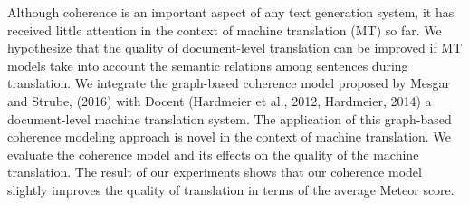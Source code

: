 Although coherence is an important aspect of any text generation system, it has received little attention in the context of machine translation (MT) so far. We hypothesize that the quality of document-level translation can be improved if MT models take into account the semantic relations among sentences during translation. We integrate the graph-based coherence model proposed by Mesgar and Strube, (2016) with Docent (Hardmeier et al., 2012, Hardmeier, 2014) a document-level machine translation system. The application of this graph-based coherence modeling approach is novel in the context of machine translation. We evaluate the coherence model and its effects on the quality of the machine translation. The result of our experiments shows that our coherence model slightly improves the quality of translation in terms of the average Meteor score.
